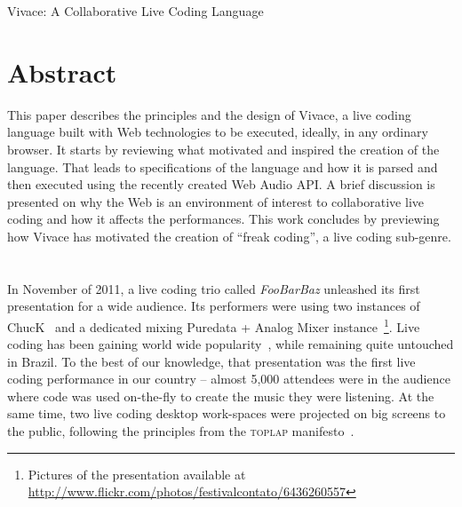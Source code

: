\documentclass[letterpaper, 12pt]{article}
\begin{document}

\vspace*{24pt}


 {\cmjTitle Vivace: A Collaborative Live Coding Language}


\section*{Abstract}

This paper describes the principles and the design of Vivace, a live
coding language built with Web technologies to be executed, ideally, in
any ordinary browser. It starts by reviewing what motivated and
inspired the creation of the language. That leads to specifications of
the language and how it is parsed and then executed using the recently
created Web Audio API. A brief discussion is presented on why the Web
is an environment of interest to collaborative live coding and how it
affects the performances. This work concludes by previewing how
Vivace has motivated the creation of ``freak coding'', a live coding
sub-genre.

\section*{} %

In November of 2011, a live coding trio called \textit{FooBarBaz}
unleashed its first presentation for a wide audience. Its performers
were using two instances of ChucK~\citep*{wang2003chuck} and a
dedicated mixing Puredata + Analog Mixer instance~\footnote{Pictures
  of the presentation available at
  \url{http://www.flickr.com/photos/festivalcontato/6436260557}}. Live
coding has been gaining world wide popularity~\citep*{nilson2007live}, while
remaining quite untouched in Brazil. To the best of our knowledge, that
presentation was the first live coding performance in our
country -- almost 5,000 attendees were in the
audience where code was used on-the-fly to create the music they were
listening. At the same time, two live coding desktop work-spaces were projected
on big screens to the public, following the principles from the
\textsc{toplap} manifesto~\citep*{ward2004live}.
\end{document}
